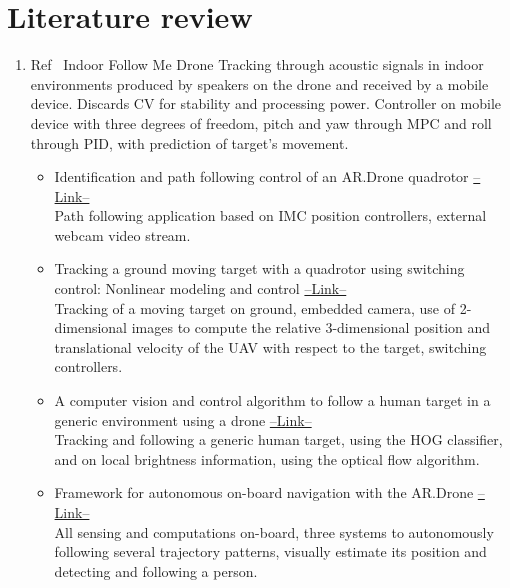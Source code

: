 \section{Literature review}


\begin{enumerate}
\item Ref~\cite{Mao2017345} Indoor Follow Me Drone
Tracking through acoustic signals in indoor environments produced by speakers on the drone and received by a mobile device. Discards CV for stability and processing power. Controller on mobile device with three degrees of freedom, pitch and yaw through MPC and roll through PID, with prediction of target's movement.
\begin{itemize}
\item Identification and path following control of an AR.Drone quadrotor \href{https://www.scopus.com/record/display.uri?eid=2-s2.0-84893212045&origin=reflist}{--Link--} \\ 
Path following application based on IMC position controllers, external webcam video stream.

\item Tracking a ground moving target with a quadrotor using switching control: Nonlinear modeling and control \href{https://www.scopus.com/record/display.uri?eid=2-s2.0-84871633622&origin=reflist}{--Link--} \\ 
Tracking of a moving target on ground, embedded camera, use of 2-dimensional images to compute the relative 3-dimensional position and translational velocity of the UAV with respect to the target, switching controllers.

\item A computer vision and control algorithm to follow a human target in a generic environment using a drone \href{https://www.scopus.com/record/display.uri?eid=2-s2.0-84978870802&origin=reflist}{--Link--} \\ 
Tracking and following a generic human target, using the HOG classifier, and on local brightness information, using the optical flow algorithm.

\item Framework for autonomous on-board navigation with the AR.Drone \href{https://www.scopus.com/record/display.uri?eid=2-s2.0-84899426060&origin=reflist}{--Link--} \\ 
All sensing and computations on-board, three systems to autonomously following several trajectory patterns, visually estimate its position and detecting and following a person.


\end{itemize}
\end{enumerate}
